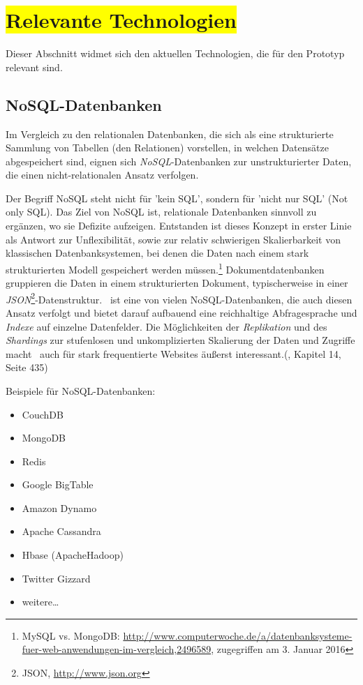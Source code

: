 \section{\colorbox{yellow}{Relevante Technologien}}

Dieser Abschnitt widmet sich den aktuellen Technologien, die für den Prototyp relevant sind.

\subsection{NoSQL-Datenbanken}

Im Vergleich zu den relationalen Datenbanken, die sich als eine strukturierte Sammlung von Tabellen (den Relationen) vorstellen, in welchen Datensätze abgespeichert sind, eignen sich \textit{NoSQL}-Datenbanken zur unstrukturierter Daten, die einen nicht-relationalen Ansatz verfolgen. 

Der Begriff NoSQL steht nicht für 'kein SQL', sondern für 'nicht nur SQL' (Not only SQL). Das Ziel von NoSQL ist, relationale Datenbanken sinnvoll zu ergänzen, wo sie Defizite aufzeigen. Entstanden ist dieses Konzept in erster Linie als Antwort zur Unflexibilität, sowie zur relativ schwierigen Skalierbarkeit von klassischen Datenbanksystemen, bei denen die Daten nach einem stark strukturierten Modell gespeichert werden müssen.\footnote{MySQL vs. MongoDB: \url{http://www.computerwoche.de/a/datenbanksysteme-fuer-web-anwendungen-im-vergleich,2496589}, zugegriffen am 3. Januar 2016} Dokumentdatenbanken gruppieren die Daten in einem strukturierten Dokument, typischerweise in einer \textit{JSON}\footnote{JSON, \url{http://www.json.org}}-Datenstruktur. \mongo\ ist eine von vielen NoSQL-Datenbanken, die auch diesen Ansatz verfolgt und bietet darauf aufbauend eine reichhaltige Abfragesprache und \textit{Indexe} auf einzelne Datenfelder. Die Möglichkeiten der \textit{Replikation} und des \textit{Shardings} zur stufenlosen und unkomplizierten Skalierung der Daten und Zugriffe macht \mongo\ auch für stark frequentierte Websites äußerst interessant.(\cite{Hollosi.2012}, Kapitel 14, Seite 435)

Beispiele für NoSQL-Datenbanken:
\begin{multicols}{2}
\begin{itemize}
\item CouchDB
\item MongoDB
\item Redis
\item Google BigTable
\item Amazon Dynamo
\item Apache Cassandra
\item Hbase (ApacheHadoop)
\item Twitter Gizzard
\item weitere…
\end{itemize}
\end{multicols}

